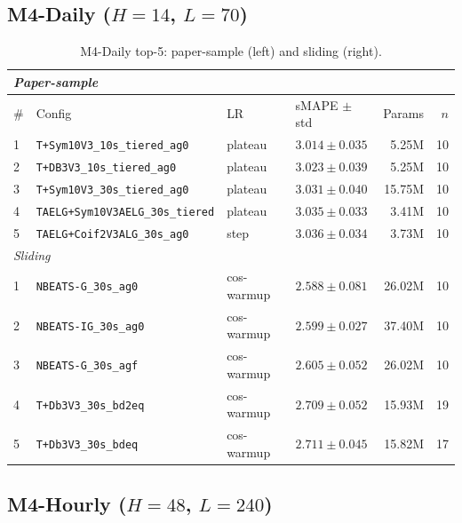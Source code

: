\documentclass{article}
\begin{document}
\subsection{\texorpdfstring{M4-Daily ($H=14$, $L=70$)}{M4-Daily (H=14, L=70)}}

\begin{table}[h]
\centering
\scriptsize
\setlength{\tabcolsep}{2.5pt}
\caption{M4-Daily top-5: paper-sample (left) and sliding (right).}
\label{tab:m4_daily_full}
\begin{tabular}{@{}llllrr@{}}
\toprule
\multicolumn{6}{l}{\textit{Paper-sample}} \\
\midrule
\# & Config & LR & sMAPE $\pm$ std & Params & $n$ \\
\midrule
1 & \texttt{T+Sym10V3\_10s\_tiered\_ag0}    & plateau & $\mathbf{3.014 \pm 0.035}$ & 5.25M & 10 \\
2 & \texttt{T+DB3V3\_10s\_tiered\_ag0}      & plateau & $3.023 \pm 0.039$          & 5.25M & 10 \\
3 & \texttt{T+Sym10V3\_30s\_tiered\_ag0}    & plateau & $3.031 \pm 0.040$          & 15.75M & 10 \\
4 & \texttt{TAELG+Sym10V3AELG\_30s\_tiered} & plateau & $3.035 \pm 0.033$          & 3.41M & 10 \\
5 & \texttt{TAELG+Coif2V3ALG\_30s\_ag0}     & step    & $3.036 \pm 0.034$          & 3.73M & 10 \\
\midrule
\multicolumn{6}{l}{\textit{Sliding}} \\
\midrule
1 & \texttt{NBEATS-G\_30s\_ag0}             & cos-warmup & $\mathbf{2.588 \pm 0.081}$ & 26.02M & 10 \\
2 & \texttt{NBEATS-IG\_30s\_ag0}            & cos-warmup & $2.599 \pm 0.027$          & 37.40M & 10 \\
3 & \texttt{NBEATS-G\_30s\_agf}             & cos-warmup & $2.605 \pm 0.052$          & 26.02M & 10 \\
4 & \texttt{T+Db3V3\_30s\_bd2eq}            & cos-warmup & $2.709 \pm 0.052$          & 15.93M & 19 \\
5 & \texttt{T+Db3V3\_30s\_bdeq}             & cos-warmup & $2.711 \pm 0.045$          & 15.82M & 17 \\
\bottomrule
\end{tabular}
\end{table}

\subsection{\texorpdfstring{M4-Hourly ($H=48$, $L=240$)}{M4-Hourly (H=48, L=240)}}
\end{document}
